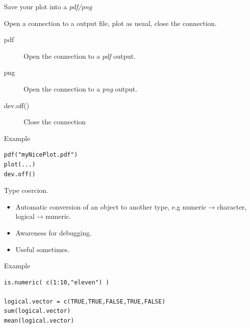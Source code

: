 \documentclass[10pt]{beamer}
\begin{document}
\begin{frame}[fragile]{Save your plot into a {\it pdf/png}}
  \begin{block}{}
    Open a connection to a output file, plot as usual, close the connection.
    \begin{description}
    \item[pdf] Open the connection to a {\it pdf} output.
    \item[png] Open the connection to a {\it png} output.
    \item[dev.off()] Close the connection
    \end{description}
  \end{block}
  \begin{exampleblock}{Example}
\begin{verbatim}
pdf("myNicePlot.pdf")
plot(...)
dev.off()
\end{verbatim}  
  \end{exampleblock}
\end{frame}

\begin{frame}[fragile]{Type coercion.}
  \begin{block}{}
    \begin{itemize}
    \item Automatic conversion of an object to another type, e.g {\sf numeric}$\rightarrow${\sf character}, {\sf logical}$\rightarrow${\sf numeric}.
    \item Awareness for debugging.
    \item Useful sometimes.
    \end{itemize}
  \end{block}
  \begin{exampleblock}{Example}
\begin{verbatim}
is.numeric( c(1:10,"eleven") )

logical.vector = c(TRUE,TRUE,FALSE,TRUE,FALSE)
sum(logical.vector)
mean(logical.vector)
\end{verbatim}  
  \end{exampleblock}
\end{frame}

\end{document}
